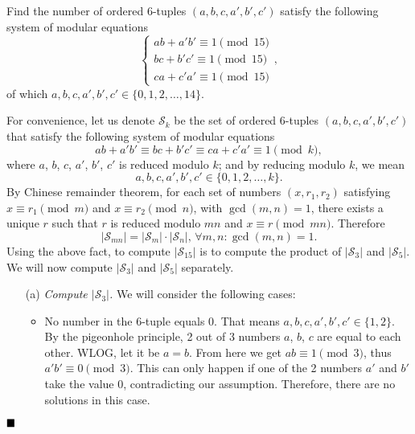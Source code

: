 \documentclass[11pt]{article}
\newenvironment{solution}[1][Solution]{%
  \proof[\normalfont \faPenNib \hspace{0.2cm} \ttfamily \scshape \large #1]%
}{\(\hfill \blacksquare\){\parfillskip0pt\par}}
\theoremstyle{definition}
\begin{document}
        \newpage

        \begin{problem}
            Find the number of ordered 6-tuples \((a,b,c,a',b',c')\) satisfy the following system of modular equations
            \[\begin{cases}
                ab + a'b' \equiv 1 \pmod{15} \\
                bc + b'c' \equiv 1 \pmod{15} \\
                ca + c'a' \equiv 1 \pmod{15} 
            \end{cases},\]
            of which \(a,b,c,a',b',c' \in \{0,1,2,\dots,14\}\).
        \end{problem}

        \begin{solution}
            For convenience, let us denote \(\mathcal{S}_k\) be the set of ordered 6-tuples \((a,b,c,a',b',c')\) that satisfy the following system of modular equations
            \[ab + a'b' \equiv bc + b'c' \equiv ca + c'a' \equiv 1 \pmod{k},\]
            where \(a\), \(b\), \(c\), \(a'\), \(b'\), \(c'\) is reduced modulo \(k\); and by reducing modulo \(k\), we mean
            \[a,b,c,a',b',c' \in \{0,1,2,\dots,k\}.\] 
            By Chinese remainder theorem, for each set of numbers \((x,r_1,r_2)\) satisfying \(x \equiv r_1 \pmod{m}\) and \(x \equiv r_2 \pmod{n}\), with \(\gcd(m,n) = 1\), there exists a unique \(r\) such that \(r\) is reduced modulo \(mn\) and \(x \equiv r \pmod{mn}\). Therefore
            \[\left|\mathcal{S}_{mn}\right| = \left|\mathcal{S}_{m}\right| \cdot \left|\mathcal{S}_{n}\right| \text{, } \forall m,n: \gcd(m,n) = 1.\]
            Using the above fact, to compute \(\left|\mathcal{S}_{15}\right|\) is to compute the product of \(\left|\mathcal{S}_{3}\right|\) and \(\left|\mathcal{S}_{5}\right|\). We will now compute \(\left|\mathcal{S}_{3}\right|\) and \(\left|\mathcal{S}_{5}\right|\) separately.

            \begin{enumerate}
                \item[(a)] \textit{Compute \(\left|\mathcal{S}_{3}\right|\).} We will consider the following cases:
                
                \begin{itemize}
                    \item No number in the 6-tuple equals 0. That means \(a,b,c,a',b',c' \in \{1,2\}\). By the pigeonhole principle, 2 out of 3 numbers \(a\), \(b\), \(c\) are equal to each other. WLOG, let it be \(a = b\). From here we get \(ab \equiv 1 \pmod3\), thus \(a'b' \equiv 0 \pmod{3}\). This can only happen if one of the 2 numbers \(a'\) and \(b'\) take the value 0, contradicting our assumption. Therefore, there are no solutions in this case.
                    

\end{itemize}
\end{enumerate}
\end{solution}
\end{document}
